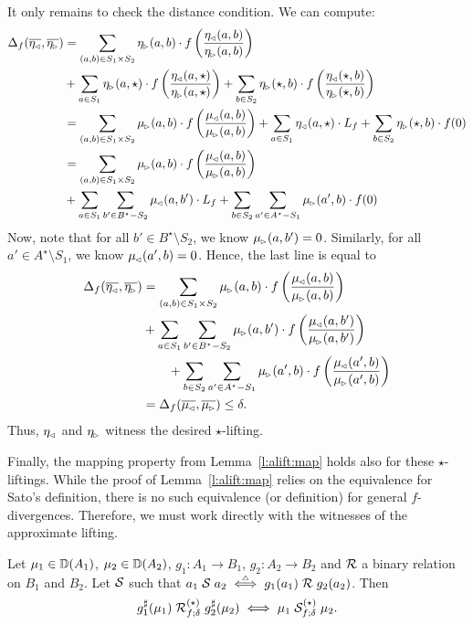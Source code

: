 \documentclass{lmcs}
\begin{document}
  It only remains to check the distance condition. We can compute:
  \begin{align*}
    \Delta_f(\overline{\eta\lside}, \overline{\eta\rside}) &=
    \sum_{(a, b) \in S_1 \times S_2} \eta\rside(a, b) \cdot
    f \left( \frac{\eta\lside(a, b)}{\eta\rside(a, b)} \right) \\
    &+ \sum_{a \in S_1} \eta\rside(a, \star) \cdot
    f \left( \frac{\eta\lside(a, \star)}{\eta\rside(a, \star)} \right)
    + \sum_{b \in S_2} \eta\rside(\star, b) \cdot
    f \left( \frac{\eta\lside(\star, b)}{\eta\rside(\star, b)} \right) \\
    &=
    \sum_{(a, b) \in S_1 \times S_2} \mu\rside(a, b) \cdot
    f \left( \frac{\mu\lside(a, b)}{\mu\rside(a, b)} \right)
    + \sum_{a \in S_1} \eta\lside(a, \star) \cdot L_f
    + \sum_{b \in S_2} \eta\rside(\star, b) \cdot f (0) \\
    &=
    \sum_{(a, b) \in S_1 \times S_2} \mu\rside(a, b) \cdot
    f \left( \frac{\mu\lside(a, b)}{\mu\rside(a, b)} \right) \\
    &+ \sum_{a \in S_1} \sum_{b' \in B^\star \setminus S_2} \mu\lside(a, b') \cdot L_f
    + \sum_{b \in S_2} \sum_{a' \in A^\star \setminus S_1} \mu\rside(a', b) \cdot f (0)
  \end{align*}
  Now, note that for all $b' \in B^\star \setminus S_2$, we know $\mu\rside(a,
  b') = 0$. Similarly, for all $a' \in A^\star \setminus S_1$, we know
  $\mu\lside(a', b) = 0$. Hence, the last line is equal to
  \begin{align*}
    \Delta_f(\overline{\eta\lside}, \overline{\eta\rside}) &=
    \sum_{(a, b) \in S_1 \times S_2} \mu\rside(a, b) \cdot
    f \left( \frac{\mu\lside(a, b)}{\mu\rside(a, b)} \right) \\
    &+ \sum_{a \in S_1} \sum_{b' \in B^\star \setminus S_2} \mu\rside(a, b')
    \cdot f \left( \frac{\mu\lside(a, b')}{\mu\rside(a, b')} \right) \\
    &\quad \quad
    + \sum_{b \in S_2} \sum_{a' \in A^\star \setminus S_1} \mu\rside(a', b) \cdot
    f \left( \frac{\mu\lside(a', b)}{\mu\rside(a', b)} \right) \\
    &= \Delta_f(\overline{\mu\lside}, \overline{\mu\rside}) \leq \delta .
  \end{align*}
  Thus, $\eta\lside$ and $\eta\rside$ witness the desired $\star$-lifting.
\endproofatend

Finally, the mapping property from Lemma~\ref{l:alift:map} holds also for these
$\star$-liftings. While the proof of Lemma~\ref{l:alift:map} relies on the
equivalence for Sato's definition, there is no such equivalence (or definition)
for general $f$-divergences.  Therefore, we must work directly with the
witnesses of the approximate lifting.
%
\begin{lem} \label{l:flift:map}
  Let $\mu_1 \in \Dist(A_1)$, $\mu_2 \in \Dist(A_2)$,
  $g_1 : A_1 \to B_1$, $g_2 : A_2 \to B_2$ and $\rR$ a binary relation
  on $B_1$ and $B_2$. Let $\rS$ such that $a_1 \mathrel{\rS} a_2
    \iffdef g_1(a_1) \rR g_2(a_2)$. Then
  \[
    \dlift{g_1}(\mu_1) \aliftnew{\rR}{f; \delta} \dlift{g_2}(\mu_2)
    \iff
    \mu_1 \aliftnew{\rS}{f; \delta} \mu_2 .
  \]
\end{lem}
\end{document}
